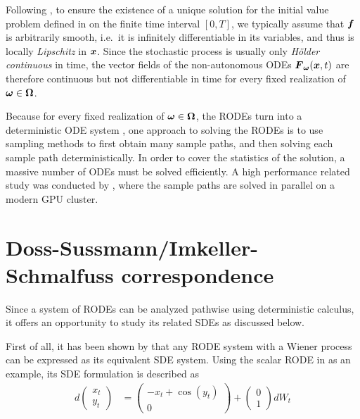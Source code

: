 Following \cite{kloeden2007pathwise}, to ensure the existence of a unique solution for the initial value problem defined in  on the finite time interval $[0,T]$, we typically assume that $\boldsymbol{f}$ is arbitrarily smooth, i.e.\ it is infinitely differentiable in its variables, and thus is locally \emph{Lipschitz} in $\boldsymbol{x}$. 
Since the stochastic process is usually only \emph{H{\"o}lder continuous} in time, the vector fields of the non-autonomous ODEs $\boldsymbol{F}_{\boldsymbol{\omega}}(\boldsymbol{x}, t)$ are therefore continuous but not differentiable in time for every fixed realization of $\boldsymbol{\omega} \in \boldsymbol{\Omega}$.

Because for every fixed realization of $\boldsymbol{\omega} \in \boldsymbol{\Omega}$, the RODEs  turn into a deterministic ODE system , one approach to solving the RODEs is to use sampling methods to first obtain many sample paths, and then solving each sample path deterministically.
In order to cover the statistics of the solution, a massive number of ODEs must be solved efficiently.
A high performance related study was conducted by \cite{riesinger2016solving}, where the sample paths are solved in parallel on a modern GPU cluster.

\section{Doss-Sussmann/Imkeller-Schmalfuss correspondence}
\label{sec-doss-sussmann}

Since a system of RODEs can be analyzed pathwise using deterministic calculus, it offers an opportunity to study its related SDEs as discussed below.

First of all, it has been shown by \cite{jentzen2011taylor} that any RODE system with a Wiener process can be expressed as its equivalent SDE system. 
Using the scalar RODE in  as an example, its SDE formulation is described as
\begin{align}
    d\begin{pmatrix}
        x_t 
        \\ 
        y_t
    \end{pmatrix}
    & = 
    \begin{pmatrix}
        -x_t + \cos{(y_t)}
        \\
        0
    \end{pmatrix}
    + 
    \begin{pmatrix}
        0
        \\
        1
    \end{pmatrix}
    dW_t
\end{align}

